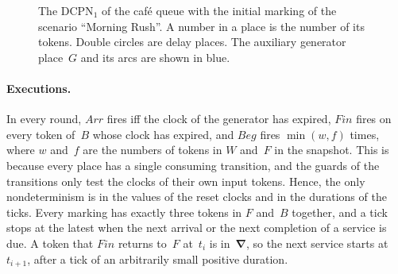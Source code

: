 \documentclass[11pt]{article}
\theoremstyle{definition}
\newcommand{\bfNabla}{\boldsymbol{\nabla}}
\newcommand{\DCPN}[1]{\texorpdfstring{\textup{DCPN}\ensuremath{_{#1}}}{DCPN#1}}
\begin{document}
\begin{figure}[t]
  \centering
  \caption{The \DCPN{1} of the café queue with the initial marking of the
    scenario ``Morning Rush''. A number in a place is the number of its
    tokens. Double circles are delay places. The auxiliary generator
    place~$G$ and its arcs are shown in blue.}
  \label{fig:cafe}
\end{figure}

\paragraph{Executions.}
In every round, $\mathit{Arr}$ fires iff the clock of the generator has
expired, $\mathit{Fin}$ fires on every token of~$B$ whose clock has expired,
and $\mathit{Beg}$ fires $\min(w, f)$ times, where $w$ and~$f$ are the
numbers of tokens in $W$ and~$F$ in the snapshot. This is because every place
has a single consuming transition, and the guards of the transitions only
test the clocks of their own input tokens. Hence, the only nondeterminism
is in the values of the reset clocks and in the durations of the ticks.
Every marking has exactly three tokens in $F$ and~$B$ together, and a tick
stops at the latest when the next arrival or the next completion of a
service is due. A token that $\mathit{Fin}$ returns to~$F$ at~$t_i$ is
in~$\bfNabla$, so the next service starts at~$t_{i + 1}$, after a tick of an
arbitrarily small positive duration.
\end{document}
